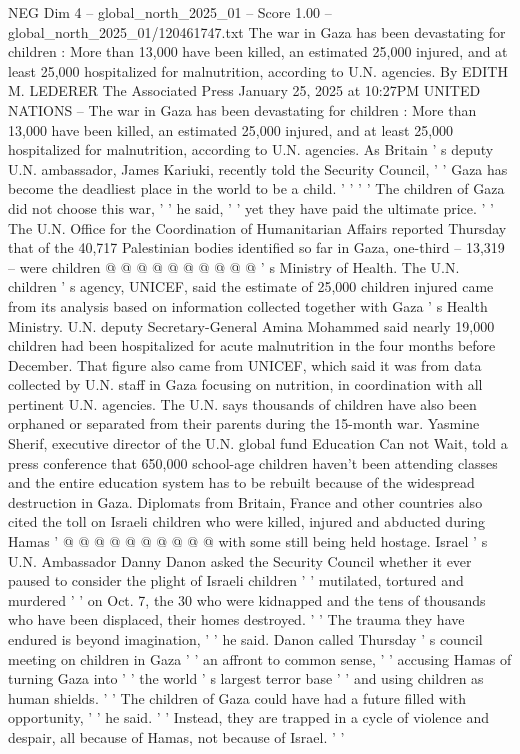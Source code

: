 \begin{textsample}{NEG Dim 4 – global\_north\_2025\_01 – Score 1.00 – global\_north\_2025\_01/120461747.txt}  \label{ex:f4_neg_412}
The war in Gaza has been devastating for children : More than 13,000 have been killed, an estimated 25,000 injured, and at least 25,000 hospitalized for malnutrition, according to U.N. agencies.
By EDITH M.
LEDERER The Associated Press January 25, 2025 at 10:27PM UNITED NATIONS -- The war in Gaza has been devastating for children : More than 13,000 have been killed, an estimated 25,000 injured, and at least 25,000 hospitalized for malnutrition, according to U.N. agencies.
As Britain ' s deputy U.N. ambassador, James Kariuki, recently told the Security Council, ' ' Gaza has become the deadliest place in the world to be a child. ' ' ' ' The children of Gaza did not choose this war, ' ' he said, ' ' yet they have paid the ultimate price. ' ' The U.N.
Office for the Coordination of Humanitarian Affairs reported Thursday that of the 40,717 Palestinian bodies identified so far in Gaza, one-third -- 13,319 -- were children @ @ @ @ @ @ @ @ @ @ ' s Ministry of Health.
The U.N. children ' s agency, UNICEF, said the estimate of 25,000 children injured came from its analysis based on information collected together with Gaza ' s Health Ministry.
U.N. deputy Secretary-General Amina Mohammed said nearly 19,000 children had been hospitalized for acute malnutrition in the four months before December.
That figure also came from UNICEF, which said it was from data collected by U.N. staff in Gaza focusing on nutrition, in coordination with all pertinent U.N. agencies.
The U.N. says thousands of children have also been orphaned or separated from their parents during the 15-month war.
Yasmine Sherif, executive director of the U.N. global fund Education Can not Wait, told a press conference that 650,000 school-age children haven't been attending classes and the entire education system has to be rebuilt because of the widespread destruction in Gaza.
Diplomats from Britain, France and other countries also cited the toll on Israeli children who were killed, injured and abducted during Hamas ' @ @ @ @ @ @ @ @ @ @ with some still being held hostage.
Israel ' s U.N.
Ambassador Danny Danon asked the Security Council whether it ever paused to consider the plight of Israeli children ' ' mutilated, tortured and murdered ' ' on Oct. 7, the 30 who were kidnapped and the tens of thousands who have been displaced, their homes destroyed. ' ' The trauma they have endured is beyond imagination, ' ' he said.
Danon called Thursday ' s council meeting on children in Gaza ' ' an affront to common sense, ' ' accusing Hamas of turning Gaza into ' ' the world ' s largest terror base ' ' and using children as human shields. ' ' The children of Gaza could have had a future filled with opportunity, ' ' he said. ' ' Instead, they are trapped in a cycle of violence and despair, all because of Hamas, not because of Israel. ' '

\end{textsample}
